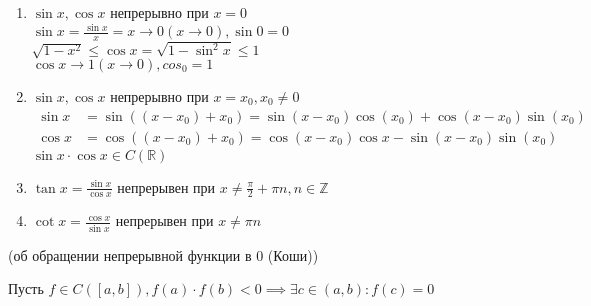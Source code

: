 \begin{eg}
\begin{enumerate}
\begin{description}
            \end{description}
        \item $\sin x, \cos x$ непрерывно при $x =0$\\
            $\sin x = \displaystyle\frac{\sin x}{x} = x \to 0 (x \to 0), \sin 0 = 0$\\
            $\sqrt{1-x^2} \le \cos x = \sqrt{1 - \sin^2 x} \le 1 $ \\
            $\cos x \to 1 (x \to 0), cos_0 = 1$\\
        \item $\sin x, \cos x$ непрерывно при $x=x_0, x_0 \neq 0$\\
            $\begin{aligned}
                \sin x &= \sin ((x-x_0) + x_0) = \sin (x-x_0)\cos (x_0) + \cos (x-x_0)\sin (x_0)\\
                \cos x &= \cos ((x-x_0)+x_0) = \cos (x-x_0)\cos x - \sin (x-x_0)\sin (x_0)
            \end{aligned}$
            $\sin x \cdot \cos x \in C(\mathbb{R})$
        \item $\tan x = \displaystyle\frac{\sin x}{\cos x}$ непрерывен при $x \neq \displaystyle\frac{\pi}{2} + \pi n, n \in \mathbb{Z}$\\
        \item $\cot x = \displaystyle\frac{\cos x}{\sin x}$ непрерывен при $x\neq \pi n$\\
    \end{enumerate}
\end{eg}

\begin{theorem} (об обращении непрерывной функции в 0 (Коши))
    
    Пусть $f \in C([a,b]), f(a) \cdot f(b) < 0 \implies \exists c \in (a,b): f(c) = 0$ 

\end{theorem}

